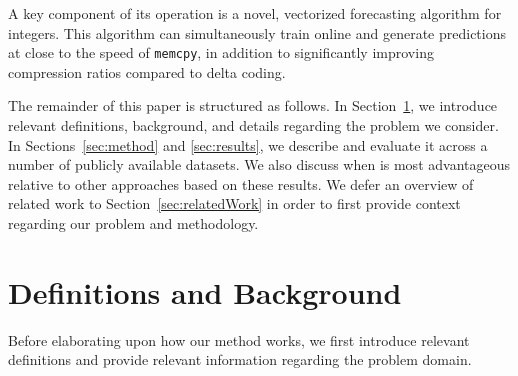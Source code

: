 A key component of its operation is a novel, vectorized forecasting algorithm for integers. This algorithm can simultaneously train online and generate predictions at close to the speed of \texttt{memcpy}, in addition to significantly improving compression ratios compared to delta coding.

The remainder of this paper is structured as follows. In Section~\ref{sec:problem}, we introduce relevant definitions, background, and details regarding the problem we consider. In Sections~\ref{sec:method} and \ref{sec:results}, we describe \minesp and evaluate it across a number of publicly available datasets. We also discuss when \minesp is most advantageous relative to other approaches based on these results. We defer an overview of related work to Section~\ref{sec:relatedWork} in order to first provide context regarding our problem and methodology.



\section{Definitions and Background} \label{sec:problem}

Before elaborating upon how our method works, we first introduce relevant definitions and provide relevant information regarding the problem domain.

